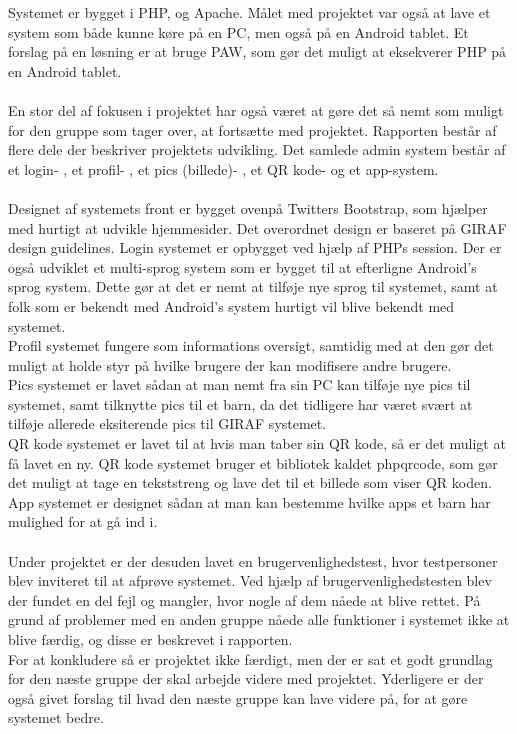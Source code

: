Systemet er bygget i PHP,  og Apache. Målet med projektet var også at lave et system som både kunne køre på en PC, men også på en Android tablet. Et forslag på en løsning er at bruge PAW, som gør det muligt at eksekverer PHP på en Android tablet. \\ 
\\
En stor del af fokusen i projektet har også været at gøre det så nemt som muligt for den gruppe som tager over, at fortsætte med projektet. Rapporten består af flere dele der beskriver projektets udvikling. Det samlede admin system består af et login- , et profil- , et pics (billede)- , et QR kode- og et app-system. \\ 
\\
Designet af systemets front er bygget ovenpå Twitters Bootstrap, som hjælper med hurtigt at udvikle hjemmesider. Det overordnet design er baseret på GIRAF design guidelines. Login systemet er opbygget ved hjælp af PHPs session. Der er også udviklet et multi-sprog system som er bygget til at efterligne Android's sprog system. Dette gør at det er nemt at tilføje nye sprog til systemet, samt at folk som er bekendt med Android's system hurtigt vil blive bekendt med systemet.\\
Profil systemet fungere som informations oversigt, samtidig med at den gør det muligt at holde styr på hvilke brugere der kan modifisere andre brugere.\\
Pics systemet er lavet sådan at man nemt fra sin PC kan tilføje nye pics til systemet, samt tilknytte pics til et barn, da det tidligere har været svært at tilføje allerede eksiterende pics til GIRAF systemet.\\
QR kode systemet er lavet til at hvis man taber sin QR kode, så er det muligt at få lavet en ny. QR kode systemet bruger et bibliotek kaldet phpqrcode, som gør det muligt at tage en tekststreng og lave det til et billede som viser QR koden.\\
App systemet er designet sådan at man kan bestemme hvilke apps et barn har mulighed for at gå ind i. \\ 
\\
Under projektet er der desuden lavet en brugervenlighedstest, hvor testpersoner blev inviteret til at afprøve systemet. Ved hjælp af brugervenlighedstesten blev der fundet en del fejl og mangler, hvor nogle af dem nåede at blive rettet. På grund af problemer med en anden gruppe nåede alle funktioner i systemet ikke at blive færdig, og disse er beskrevet i rapporten. \\
For at konkludere så er projektet ikke færdigt, men der er sat et godt grundlag for den næste gruppe der skal arbejde videre med projektet. Yderligere er der også givet forslag til hvad den næste gruppe kan lave videre på, for at gøre systemet bedre.